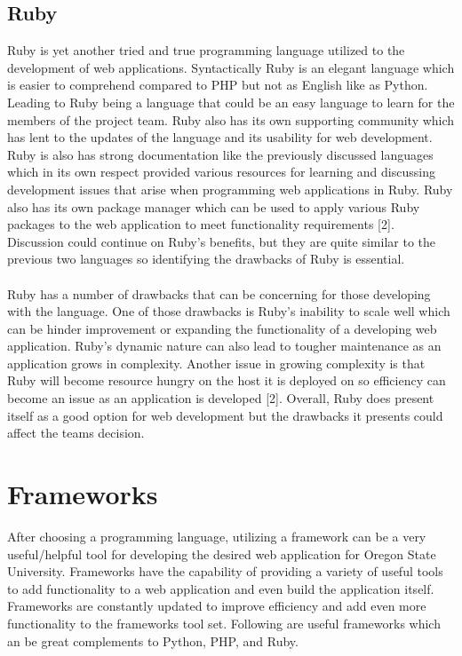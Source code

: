 \documentclass[onecolumn, draftclsnofoot,10pt, compsoc]{IEEEtran}
\begin{document}
\subsection{Ruby}
Ruby is yet another tried and true programming language utilized to the development of web applications. Syntactically Ruby is an elegant language which is easier to comprehend compared to PHP but not as English like as Python. Leading to Ruby being a language that could be an easy language to learn for the members of the project team. Ruby also has its own supporting community which has lent to the updates of the language and its usability for web development. Ruby is also has strong documentation like the previously discussed languages which in its own respect provided various resources for learning and discussing development issues that arise when programming web applications in Ruby. Ruby also has its own package manager which can be used to apply various Ruby packages to the web application to meet functionality requirements [2]. Discussion could continue on Ruby’s benefits, but they are quite similar to the previous two languages so identifying the drawbacks of Ruby is essential. \\
\\
\indent Ruby has a number of drawbacks that can be concerning for those developing with the language. One of those drawbacks is Ruby’s inability to scale well which can be hinder improvement or expanding the functionality of a developing web application. Ruby’s dynamic nature can also lead to tougher maintenance as an application grows in complexity. Another issue in growing complexity is that Ruby will become resource hungry on the host it is deployed on so efficiency can become an issue as an application is developed [2].  Overall, Ruby does present itself as a good option for web development but the drawbacks it presents could affect the teams decision.    

\section{Frameworks}
 After choosing a programming language, utilizing a framework can be a very useful/helpful tool for developing the desired web application for Oregon State University. Frameworks have the capability of providing a variety of useful tools to add functionality to a web application and even build the application itself. Frameworks are constantly updated to improve efficiency and add even more functionality to the frameworks tool set. Following are useful frameworks which an be great complements to Python, PHP, and Ruby. 
 
\end{document}
